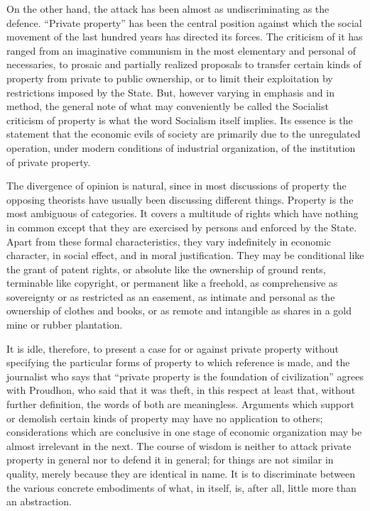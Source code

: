 \documentclass{book}
\begin{document}
On the other hand, the attack has been almost as undiscriminating as the defence. “Private property” has been the central position against which the social movement of the last hundred years has directed its forces. The criticism of it has ranged from an imaginative communism in the most elementary and personal of necessaries, to prosaic and partially realized proposals to transfer certain kinds of property from private to public ownership, or to limit their exploitation by restrictions imposed by the State. But, however varying in emphasis and in method, the general note of what may conveniently be called the Socialist criticism of property is what the word Socialism itself implies. Its essence is the statement that the economic evils of society are primarily due to the unregulated operation, under modern conditions of industrial organization, of the institution of private property.

The divergence of opinion is natural, since in most discussions of property the opposing theorists have usually been discussing different things. Property is the most ambiguous of categories. It covers a multitude of rights which have nothing in common except that they are exercised by persons and enforced by the State. Apart from these formal characteristics, they vary indefinitely in economic character, in social effect, and in moral justification. They may be conditional like the grant of patent rights, or absolute like the ownership of ground rents, terminable like copyright, or permanent like a freehold, as comprehensive as sovereignty or as restricted as an easement, as intimate and personal as the ownership of clothes and books, or as remote and intangible as shares in a gold mine or rubber plantation.

It is idle, therefore, to present a case for or against private property without specifying the particular forms of property to which reference is made, and the journalist who says that “private property is the foundation of civilization” agrees with Proudhon, who said that it was theft, in this respect at least that, without further definition, the words of both are meaningless. Arguments which support or demolish certain kinds of property may have no application to others; considerations which are conclusive in one stage of economic organization may be almost irrelevant in the next. The course of wisdom is neither to attack private property in general nor to defend it in general; for things are not similar in quality, merely because they are identical in name. It is to discriminate between the various concrete embodiments of what, in itself, is, after all, little more than an abstraction.
\end{document}
